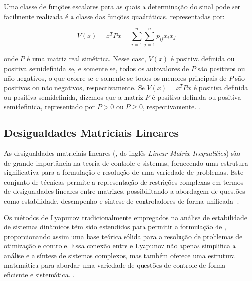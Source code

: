 Uma classe de funções escalares para as quais a determinação do sinal pode ser facilmente realizada é a classe das funções quadráticas, representadas por:

\begin{equation}
  V(x) = x^T P x = \sum_{i=1}^n \sum_{j=1}^n p_{ij} x_i x_j
  \label{eq:lyapunov4}
\end{equation}

\noindent onde $P$ é uma matriz real simétrica. Nesse caso, $V(x)$ é positiva definida ou positiva semidefinida se, e somente se, todos os autovalores de $P$ são positivos ou não negativos, o que ocorre se e somente se todos os menores principais de $P$ são positivos ou não negativos, respectivamente. Se $V(x) = x^T P x$ é positiva definida ou positiva semidefinida, dizemos que a matriz $P$ é positiva definida ou positiva semidefinida, representado por $P > 0$ ou $P \geq 0$, respectivamente. \cite{khalil2002}.

\subsection{Desigualdades Matriciais Lineares}

As desigualdades matriciais lineares (, do inglês \textit{Linear Matrix Inequalities}) são de grande importância na teoria de controle e sistemas, fornecendo uma estrutura significativa para a formulação e resolução de uma variedade de problemas. Este conjunto de técnicas permite a representação de restrições complexas em termos de desigualdades lineares entre matrizes, possibilitando a abordagem de questões como estabilidade, desempenho e síntese de controladores de forma unificada. \cite{boyd1994}.

Os métodos de Lyapunov tradicionalmente empregados na análise de estabilidade de sistemas dinâmicos têm sido estendidos para permitir a formulação de , proporcionando assim uma base teórica sólida para a resolução de problemas de otimização e controle. Essa conexão entre  e Lyapunov não apenas simplifica a análise e a síntese de sistemas complexos, mas também oferece uma estrutura matemática para abordar uma variedade de questões de controle de forma eficiente e sistemática. \cite{boyd1994}.

